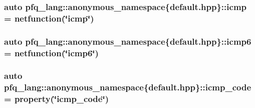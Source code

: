 \hypertarget{namespacepfq__lang_1_1anonymous__namespace_02default_8hpp_03_a180c8185595965a528fd2590da7dbeb9}{
\subsubsection[{icmp}]{\setlength{\rightskip}{0pt plus 5cm}auto pfq\+\_\+lang\+::anonymous\+\_\+namespace\{default.\+hpp\}\+::icmp = {\bf netfunction}(\char`\"{}icmp\char`\"{})}}\label{namespacepfq__lang_1_1anonymous__namespace_02default_8hpp_03_a180c8185595965a528fd2590da7dbeb9}
\hypertarget{namespacepfq__lang_1_1anonymous__namespace_02default_8hpp_03_ab1e01b177ae34e48f61eed78580aeac0}{
\subsubsection[{icmp6}]{\setlength{\rightskip}{0pt plus 5cm}auto pfq\+\_\+lang\+::anonymous\+\_\+namespace\{default.\+hpp\}\+::icmp6 = {\bf netfunction}(\char`\"{}icmp6\char`\"{})}}\label{namespacepfq__lang_1_1anonymous__namespace_02default_8hpp_03_ab1e01b177ae34e48f61eed78580aeac0}
\hypertarget{namespacepfq__lang_1_1anonymous__namespace_02default_8hpp_03_aad0f666aca065f5aaf283857e5c933ce}{
\subsubsection[{icmp\+\_\+code}]{\setlength{\rightskip}{0pt plus 5cm}auto pfq\+\_\+lang\+::anonymous\+\_\+namespace\{default.\+hpp\}\+::icmp\+\_\+code = {\bf property}(\char`\"{}icmp\+\_\+code\char`\"{})}}\label{namespacepfq__lang_1_1anonymous__namespace_02default_8hpp_03_aad0f666aca065f5aaf283857e5c933ce}
